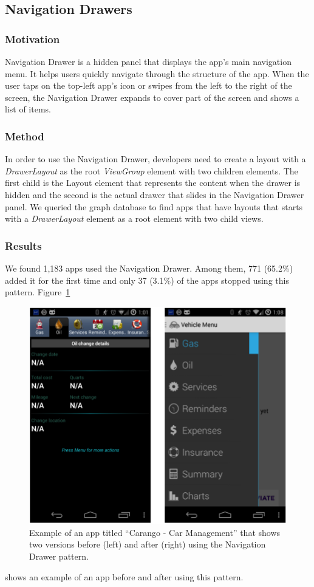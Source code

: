 \subsection{Navigation Drawers}

\subsubsection{Motivation}
Navigation Drawer is a hidden panel that displays the app's main navigation menu. 
It helps users quickly navigate through the structure of the app. 
When the user taps on the top-left app's icon or swipes from the left to the right of the screen, the Navigation Drawer expands to cover part of the screen and shows a list of items.

\subsubsection{Method}
In order to use the Navigation Drawer, developers need to create a layout with a \textit{DrawerLayout} as the root \textit{ViewGroup} element with two children elements. 
The first child is the Layout element that represents the content when the drawer is hidden and the second is the actual drawer that slides in the Navigation Drawer panel. 
We queried the graph database to find apps that have layouts that starts with a \textit{DrawerLayout} element as a root element with two child views.

\subsubsection{Results}
We found 1,183 apps used the Navigation Drawer. 
Among them, 771 (65.2\%) added it for the first time and only 37 (3.1\%) of the apps stopped using this pattern. Figure~\ref{fig:fig_drawer}
\begin{figure}[!t]
	\centering
	\includegraphics{figures/design-pattern-changes/drawer}
	\caption{Example of an app titled ``Carango - Car Management'' that shows two versions before (left) and after (right) using the Navigation Drawer pattern.}
	\label{fig:fig_drawer}
\end{figure}
shows an example of an app before and after using this pattern.

